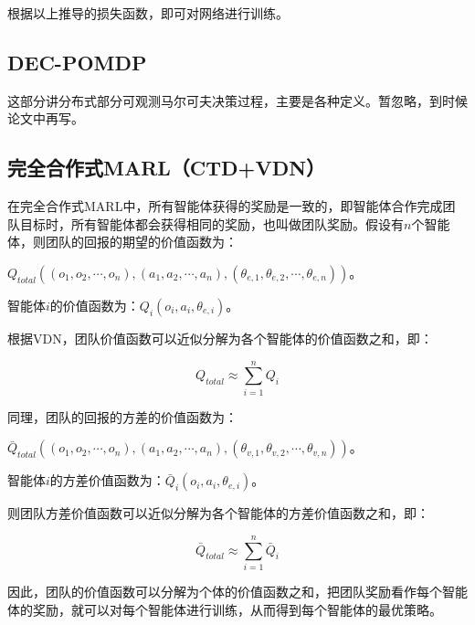 \documentclass[UTF8]{ctexart}
\begin{document}
根据以上推导的损失函数，即可对网络进行训练。

\subsection{DEC-POMDP}
这部分讲分布式部分可观测马尔可夫决策过程，主要是各种定义。暂忽略，到时候论文中再写。

\subsection{完全合作式MARL（CTD+VDN）}

在完全合作式MARL中，所有智能体获得的奖励是一致的，即智能体合作完成团队目标时，所有智能体都会获得相同的奖励，也叫做团队奖励。假设有$n$个智能体，则团队的回报的期望的价值函数为：

$Q_{total}((o_1, o_2, \cdots, o_n), (a_1, a_2, \cdots, a_n), (\theta_{e, 1}, \theta_{e, 2}, \cdots, \theta_{e, n}))$。

智能体$i$的价值函数为：$Q_i(o_i, a_i, \theta_{e, i})$。

根据VDN，团队价值函数可以近似分解为各个智能体的价值函数之和，即：

$$
Q_{total} \approx \sum_{i=1}^{n}Q_i
$$

同理，团队的回报的方差的价值函数为：

$\bar{Q}_{total}((o_1, o_2, \cdots, o_n), (a_1, a_2, \cdots, a_n), (\theta_{v, 1}, \theta_{v, 2}, \cdots, \theta_{v, n}))$。

智能体$i$的方差价值函数为：$\bar{Q}_i(o_i, a_i, \theta_{e, i})$。

则团队方差价值函数可以近似分解为各个智能体的方差价值函数之和，即：

$$
\bar{Q}_{total} \approx \sum_{i=1}^{n}\bar{Q}_i
$$

因此，团队的价值函数可以分解为个体的价值函数之和，把团队奖励看作每个智能体的奖励，就可以对每个智能体进行训练，从而得到每个智能体的最优策略。

	
\end{document}
